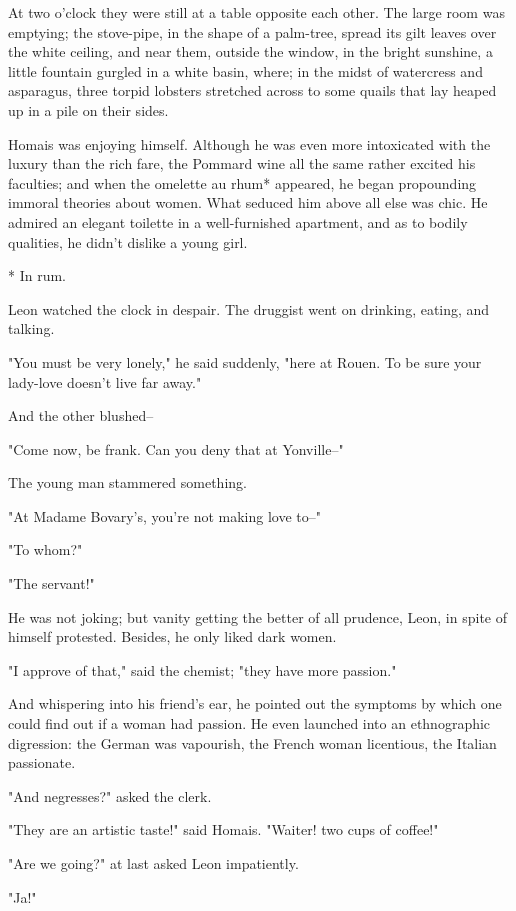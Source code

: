 \documentclass[11pt,twocolumn]{ltugboat}
\begin{document}
At two o'clock they were still at a table opposite each other. The large
room was emptying; the stove-pipe, in the shape of a palm-tree, spread
its gilt leaves over the white ceiling, and near them, outside the
window, in the bright sunshine, a little fountain gurgled in a white
basin, where; in the midst of watercress and asparagus, three torpid
lobsters stretched across to some quails that lay heaped up in a pile on
their sides.

Homais was enjoying himself. Although he was even more intoxicated with
the luxury than the rich fare, the Pommard wine all the same rather
excited his faculties; and when the omelette au rhum* appeared, he began
propounding immoral theories about women. What seduced him above all
else was chic. He admired an elegant toilette in a well-furnished
apartment, and as to bodily qualities, he didn't dislike a young girl.

     * In rum.


Leon watched the clock in despair. The druggist went on drinking,
eating, and talking.

"You must be very lonely," he said suddenly, "here at Rouen. To be sure
your lady-love doesn't live far away."

And the other blushed--

"Come now, be frank. Can you deny that at Yonville--"

The young man stammered something.

"At Madame Bovary's, you're not making love to--"

"To whom?"

"The servant!"

He was not joking; but vanity getting the better of all prudence, Leon,
in spite of himself protested. Besides, he only liked dark women.

"I approve of that," said the chemist; "they have more passion."

And whispering into his friend's ear, he pointed out the symptoms by
which one could find out if a woman had passion. He even launched into
an ethnographic digression: the German was vapourish, the French woman
licentious, the Italian passionate.

"And negresses?" asked the clerk.

"They are an artistic taste!" said Homais. "Waiter! two cups of coffee!"

"Are we going?" at last asked Leon impatiently.

"Ja!"
\end{document}
